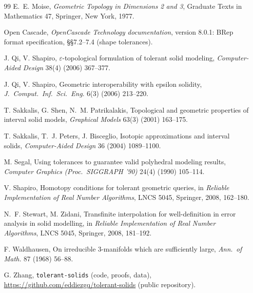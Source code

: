 \begin{thebibliography}{99}
 E.~E. Moise, \emph{Geometric Topology in Dimensions 2 and 3}, Graduate Texts in Mathematics 47,
Springer, New York, 1977.

 Open Cascade, \emph{OpenCascade Technology documentation}, version 8.0.1: BRep format specification,
\S\S7.2--7.4 (shape tolerances).

 J. Qi, V. Shapiro, $\varepsilon$-topological formulation of tolerant solid modeling,
\emph{Computer-Aided Design} 38(4) (2006) 367--377.

 J. Qi, V. Shapiro, Geometric interoperability with epsilon solidity, \emph{J.\ Comput.\ Inf.\
Sci.\ Eng.} 6(3) (2006) 213--220.

 T. Sakkalis, G. Shen, N.~M. Patrikalakis, Topological and geometric properties of interval solid
models, \emph{Graphical Models} 63(3) (2001) 163--175.

 T. Sakkalis, T.~J. Peters, J. Bisceglio, Isotopic approximations and interval solids,
\emph{Computer-Aided Design} 36 (2004) 1089--1100.

 M. Segal, Using tolerances to guarantee valid polyhedral modeling results, \emph{Computer
Graphics (Proc.\ SIGGRAPH '90)} 24(4) (1990) 105--114.

 V. Shapiro, Homotopy conditions for tolerant geometric queries, in \emph{Reliable Implementation
of Real Number Algorithms}, LNCS 5045, Springer, 2008, 162--180.

 N.~F. Stewart, M. Zidani, Transfinite interpolation for well-definition in error analysis in solid
modelling, in \emph{Reliable Implementation of Real Number Algorithms}, LNCS 5045, Springer, 2008, 181--192.

 F. Waldhausen, On irreducible 3-manifolds which are sufficiently large, \emph{Ann.\ of
Math.} 87 (1968) 56--88.

 G. Zhang, \texttt{tolerant-solids} (code, proofs, data), \url{https://github.com/eddiezgq/tolerant-solids}
(public repository).

\end{thebibliography}
